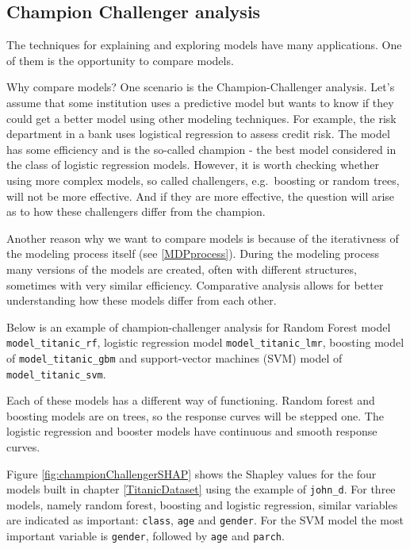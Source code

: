 \documentclass[12pt,]{krantz}
\begin{document}
\hypertarget{champion-challenger-analysis-1}{%
\subsection{Champion Challenger analysis}\label{champion-challenger-analysis-1}}

The techniques for explaining and exploring models have many applications. One of them is the opportunity to compare models.

Why compare models?
One scenario is the Champion-Challenger analysis. Let's assume that some institution uses a predictive model but wants to know if they could get a better model using other modeling techniques. For example, the risk department in a bank uses logistical regression to assess credit risk. The model has some efficiency and is the so-called champion - the best model considered in the class of logistic regression models.
However, it is worth checking whether using more complex models, so called challengers, e.g.~boosting or random trees, will not be more effective. And if they are more effective, the question will arise as to how these challengers differ from the champion.

Another reason why we want to compare models is because of the iterativness of the modeling process itself (see \ref{MDPprocess}). During the modeling process many versions of the models are created, often with different structures, sometimes with very similar efficiency. Comparative analysis allows for better understanding how these models differ from each other.

Below is an example of champion-challenger analysis for Random Forest model \texttt{model\_titanic\_rf}, logistic regression model \texttt{model\_titanic\_lmr}, boosting model of \texttt{model\_titanic\_gbm} and support-vector machines (SVM) model of \texttt{model\_titanic\_svm}.

Each of these models has a different way of functioning. Random forest and boosting models are on trees, so the response curves will be stepped one. The logistic regression and booster models have continuous and smooth response curves.

Figure \ref{fig:championChallengerSHAP} shows the Shapley values for the four models built in chapter \ref{TitanicDataset} using the example of \texttt{john\_d}. For three models, namely random forest, boosting and logistic regression, similar variables are indicated as important: \texttt{class}, \texttt{age} and \texttt{gender}. For the SVM model the most important variable is \texttt{gender}, followed by \texttt{age} and \texttt{parch}.
\end{document}
